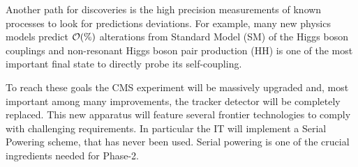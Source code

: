 \documentclass[a4paper,11pt,english]{article}
\begin{document}
Another path for discoveries is the high precision measurements of known processes to look for predictions deviations. For example, many new physics models predict $\cal{O}(\%)$ alterations from Standard Model (SM) of the Higgs boson couplings and non-resonant Higgs boson pair production (HH) is one of the most important final state to directly probe its self-coupling. 

To reach these goals the CMS experiment will be massively upgraded and, most important among many improvements, the tracker detector will be completely replaced. This new apparatus will feature several frontier technologies to comply with challenging requirements. In particular the IT %
will implement a Serial Powering scheme, that has never been used.  Serial powering is one of the crucial ingredients needed for Phase-2. %
\end{document}
